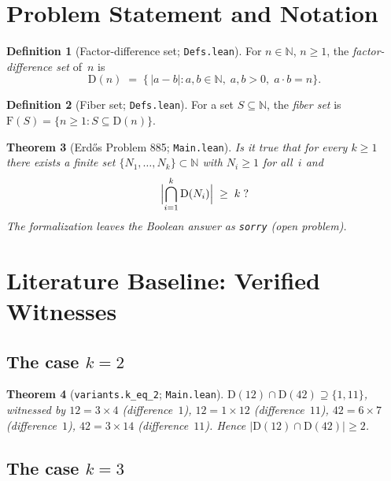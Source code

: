 \documentclass[11pt,a4paper]{article}
\newtheorem{theorem}{Theorem}[section]
\theoremstyle{definition}
\newtheorem{definition}[theorem]{Definition}
\theoremstyle{remark}
\newcommand{\NN}{\mathbb{N}}
\newcommand{\factorDiff}{\mathrm{D}}
\newcommand{\fiberSet}{\mathrm{F}}
\newcommand{\abs}[1]{\lvert #1\rvert}
\begin{document}
\section{Problem Statement and Notation}\label{sec:statement}

\begin{definition}[Factor-difference set; \texttt{Defs.lean}]\label{def:factordiff}
For $n\in\NN$, $n\ge 1$, the \emph{factor-difference set} of~$n$ is
\[
  \factorDiff(n) \;=\; \bigl\{\,\abs{a-b} : a,b\in\NN,\; a,b>0,\;
  a\cdot b = n\bigr\}.
\]
\end{definition}

\begin{definition}[Fiber set; \texttt{Defs.lean}]\label{def:fiber}
For a set $S\subseteq\NN$, the \emph{fiber set} is
$\fiberSet(S)=\{n\ge 1 : S\subseteq\factorDiff(n)\}$.
\end{definition}

\begin{theorem}[Erd\H{o}s Problem 885; \texttt{Main.lean}]\label{thm:e885}
Is it true that for every $k\ge 1$ there exists a finite set
$\{N_1,\dots,N_k\}\subset\NN$ with $N_i\ge 1$ for all~$i$ and
\[
  \Bigl\lvert\bigcap_{i=1}^{k}\factorDiff(N_i)\Bigr\rvert\;\ge\; k\;?
\]
The formalization leaves the Boolean answer as \texttt{sorry} (open problem).
\end{theorem}

\section{Literature Baseline: Verified Witnesses}\label{sec:witnesses}

\subsection{The case $k=2$}

\begin{theorem}[\texttt{variants.k\_eq\_2}; \texttt{Main.lean}]
$\factorDiff(12)\cap\factorDiff(42)\supseteq\{1,11\}$, witnessed by
$12 = 3\times 4$ (difference~$1$), $12 = 1\times 12$ (difference~$11$),
$42 = 6\times 7$ (difference~$1$), $42 = 3\times 14$ (difference~$11$).
Hence $\lvert\factorDiff(12)\cap\factorDiff(42)\rvert\ge 2$.
\end{theorem}

\subsection{The case $k=3$}
\end{document}
